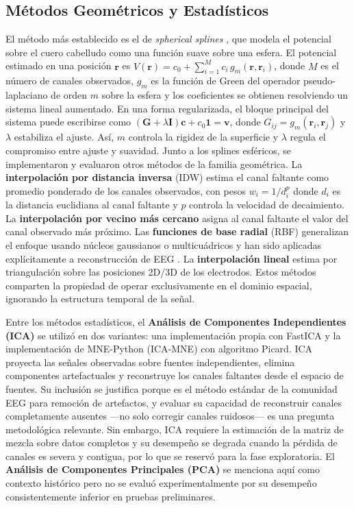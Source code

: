 \subsection{Métodos Geométricos y Estadísticos}

El método más establecido es el de \textit{spherical splines} \cite{perrin1989}, que modela el potencial sobre el cuero cabelludo como una función suave sobre una esfera. El potencial estimado en una posición $\mathbf{r}$ es $\hat{V}(\mathbf{r}) = c_0 + \sum_{i=1}^{M} c_i \, g_m(\mathbf{r}, \mathbf{r}_i)$, donde $M$ es el número de canales observados, $g_m$ es la función de Green del operador pseudo-laplaciano de orden $m$ sobre la esfera y los coeficientes se obtienen resolviendo un sistema lineal aumentado. En una forma regularizada, el bloque principal del sistema puede escribirse como $(\mathbf{G} + \lambda \mathbf{I})\mathbf{c} + c_0\mathbf{1}=\mathbf{v}$, donde $G_{ij}=g_m(\mathbf{r}_i,\mathbf{r}_j)$ y $\lambda$ estabiliza el ajuste. Así, $m$ controla la rigidez de la superficie y $\lambda$ regula el compromiso entre ajuste y suavidad.
Junto a los splines esféricos, se implementaron y evaluaron otros métodos de la familia geométrica. La \textbf{interpolación por distancia inversa} (IDW) estima el canal faltante como promedio ponderado de los canales observados, con pesos $w_i = 1/d_i^p$ donde $d_i$ es la distancia euclidiana al canal faltante y $p$ controla la velocidad de decaimiento. La \textbf{interpolación por vecino más cercano} asigna al canal faltante el valor del canal observado más próximo. Las \textbf{funciones de base radial} (RBF) generalizan el enfoque usando núcleos gaussianos o multicuádricos y han sido aplicadas explícitamente a reconstrucción de EEG \cite{jager2016rbf}. La \textbf{interpolación lineal} estima por triangulación sobre las posiciones 2D/3D de los electrodos. Estos métodos comparten la propiedad de operar exclusivamente en el dominio espacial, ignorando la estructura temporal de la señal.

Entre los métodos estadísticos, el \textbf{Análisis de Componentes Independientes (ICA)} \cite{jung2001imaging} se utilizó en dos variantes: una implementación propia con FastICA y la implementación de MNE-Python (ICA-MNE) con algoritmo Picard. ICA proyecta las señales observadas sobre fuentes independientes, elimina componentes artefactuales y reconstruye los canales faltantes desde el espacio de fuentes. Su inclusión se justifica porque es el método estándar de la comunidad EEG para remoción de artefactos, y evaluar su capacidad de reconstruir canales completamente ausentes —no solo corregir canales ruidosos— es una pregunta metodológica relevante. Sin embargo, ICA requiere la estimación de la matriz de mezcla sobre datos completos y su desempeño se degrada cuando la pérdida de canales es severa y contigua, por lo que se reservó para la fase exploratoria. El \textbf{Análisis de Componentes Principales (PCA)} se menciona aquí como contexto histórico pero no se evaluó experimentalmente por su desempeño consistentemente inferior en pruebas preliminares.
